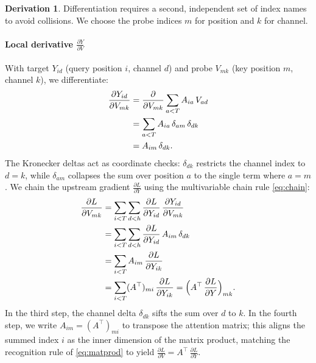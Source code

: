 \documentclass[letterpaper, 10 pt, conference]{ieeeconf}
\newcommand{\pdv}[2]{\frac{\partial #1}{\partial #2}}
\newcommand{\dL}[1]{\pdv{L}{#1}}
\newcommand{\kron}[2]{\delta_{#1 #2}}
\theoremstyle{definition}
\newtheorem*{derivation}{Derivation}
\begin{document}
\begin{derivation}
  Differentiation requires a second, independent set of index names to avoid collisions. We choose the probe indices $m$ for position and $k$ for channel.

  \paragraph{Local derivative $\pdv{Y}{V}$}
  With target $Y_{id}$ (query position $i$, channel $d$) and probe $V_{mk}$ (key position $m$, channel $k$), we differentiate:
  \begin{align}
    \pdv{Y_{id}}{V_{mk}}
     & = \pdv{}{V_{mk}} \sum_{a<T} A_{ia}\,V_{ad} \notag    \\
     & = \sum_{a<T} A_{ia}\,\kron{a}{m}\,\kron{d}{k} \notag \\
     & = A_{im}\,\kron{d}{k}.
    \label{eq:att-dydv}
  \end{align}
  The Kronecker deltas act as coordinate checks: $\kron{d}{k}$ restricts the channel index to $d=k$, while $\kron{a}{m}$ collapses the sum over position $a$ to the single term where $a=m$. We chain the upstream gradient $\dL{Y}$ using the multivariable chain rule \eqref{eq:chain}:
  \begin{align}
    \dL{V_{mk}}
     & = \sum_{i<T} \sum_{d<h} \dL{Y_{id}}\,\pdv{Y_{id}}{V_{mk}} \notag \\
     & = \sum_{i<T} \sum_{d<h} \dL{Y_{id}}\,A_{im}\,\kron{d}{k} \notag  \\
     & = \sum_{i<T} A_{im}\,\dL{Y_{ik}} \notag                          \\
     & = \sum_{i<T} (A^{\top})_{mi}\,\dL{Y_{ik}}
    = \Bigl( A^{\top}\,\dL{Y} \Bigr)_{mk}.
    \label{eq:att-chain-dv}
  \end{align}
  In the third step, the channel delta $\kron{d}{k}$ sifts the sum over $d$ to $k$. In the fourth step, we write $A_{im} = (A^{\top})_{mi}$ to transpose the attention matrix; this aligns the summed index $i$ as the inner dimension of the matrix product, matching the recognition rule of \eqref{eq:matprod} to yield $\dL{V} = A^{\top}\,\dL{Y}$.


\end{derivation}
\end{document}
